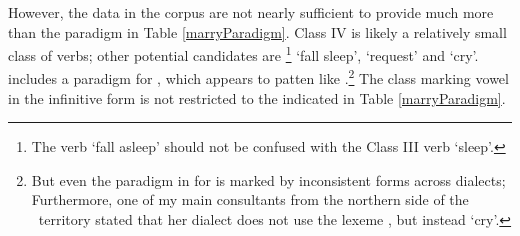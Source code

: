 However, the data in the corpus are not nearly sufficient to provide much more than the paradigm in Table \vref{marryParadigm}. %
Class IV is likely a relatively small class of verbs; other potential candidates are \mbox{}\footnote{The verb  ‘fall asleep’ should not be confused with the Class III verb {} ‘sleep’.} %
‘fall sleep’,  ‘request’ and  ‘cry’. \citet[154]{Lehtiranta1992} includes a paradigm for , which appears to patten like .\footnote{But even the paradigm in \citet[154]{Lehtiranta1992} for  is marked by inconsistent forms across dialects; Furthermore, one of my main consultants from the northern side of the \PS\ territory stated that her dialect does not use the lexeme , but instead  ‘cry’.} 
The class marking vowel in the infinitive form is not restricted to the  indicated in Table \vref{marryParadigm}. 

